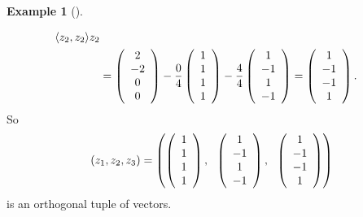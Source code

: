 \documentclass[numbers=enddot,12pt,final,onecolumn,notitlepage]{scrartcl}%
\numberwithin{exer}{subsection}
\theoremstyle{definition}
\newtheorem{exam}[theo]{Example}
\newenvironment{example}[1][]
{\begin{exam}[#1]\begin{leftbar}}
{\end{leftbar}\end{exam}}
\begin{document}
\begin{example}
\begin{align*}
{}{\left\langle z_{2},z_{2}\right\rangle }z_{2}\\
&  =\left(
\begin{array}
[c]{c}%
2\\
-2\\
0\\
0
\end{array}
\right)  -\dfrac{0}{4}\left(
\begin{array}
[c]{c}%
1\\
1\\
1\\
1
\end{array}
\right)  -\dfrac{4}{4}\left(
\begin{array}
[c]{c}%
1\\
-1\\
1\\
-1
\end{array}
\right)  =\left(
\begin{array}
[c]{c}%
1\\
-1\\
-1\\
1
\end{array}
\right)  .
\end{align*}
So
\[
\left(  z_{1},z_{2},z_{3}\right)  =\left(  \left(
\begin{array}
[c]{c}%
1\\
1\\
1\\
1
\end{array}
\right)  ,\ \ \left(
\begin{array}
[c]{c}%
1\\
-1\\
1\\
-1
\end{array}
\right)  ,\ \ \left(
\begin{array}
[c]{c}%
1\\
-1\\
-1\\
1
\end{array}
\right)  \right)
\]
is an orthogonal tuple of vectors.


\end{example}
\end{document}
